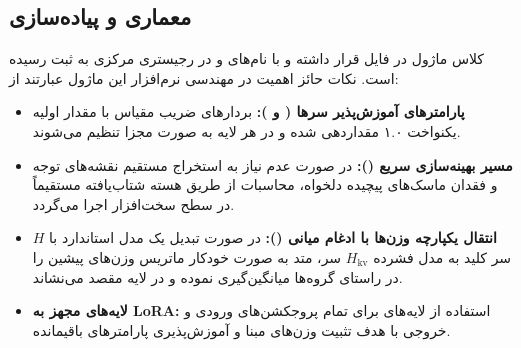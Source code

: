 \subsection{معماری و پیاده‌سازی}
کلاس ماژول  در فایل  قرار داشته و با نام‌های  و  در رجیستری مرکزی به ثبت رسیده است. نکات حائز اهمیت در مهندسی نرم‌افزار این ماژول عبارتند از:
\begin{itemize}
    \item \textbf{پارامترهای آموزش‌پذیر سرها ( و ):} بردارهای ضریب مقیاس با مقدار اولیه یکنواخت ۱.۰ مقداردهی شده و در هر لایه به صورت مجزا تنظیم می‌شوند.
    \item \textbf{مسیر بهینه‌سازی سریع ():} در صورت عدم نیاز به استخراج مستقیم نقشه‌های توجه و فقدان ماسک‌های پیچیده دلخواه، محاسبات از طریق هسته شتاب‌یافته  مستقیماً در سطح سخت‌افزار اجرا می‌گردد.
    \item \textbf{انتقال یکپارچه وزن‌ها با ادغام میانی ():} در صورت تبدیل یک مدل استاندارد  با $H$ سر کلید به مدل فشرده $H_{\text{kv}}$ سر، متد  به صورت خودکار ماتریس وزن‌های پیشین را در راستای گروه‌ها میانگین‌گیری نموده و در لایه مقصد می‌نشاند.
    \item \textbf{لایه‌های مجهز به LoRA:} استفاده از لایه‌های  برای تمام پروجکشن‌های ورودی و خروجی با هدف تثبیت وزن‌های مبنا و آموزش‌پذیری پارامترهای باقیمانده.
\end{itemize}
